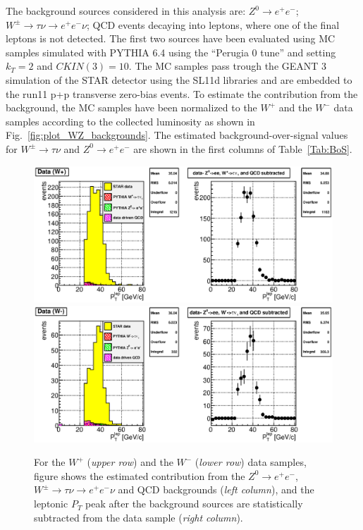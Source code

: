 \documentclass[12pt]{article}
\begin{document}
The background sources considered in this analysis are: 
$Z^{0} \rightarrow e^+e^-$; 
$W^{\pm} \rightarrow \tau\nu \rightarrow e^+e^-\nu$; 
QCD events decaying into leptons, where one of the final leptons is not detected.
The first two sources have been evaluated using MC samples simulated with PYTHIA 6.4 using the ``Perugia 0 tune'' and setting $k_{T}=2$ and $CKIN(3)=10$. The MC samples pass trough the GEANT 3 simulation of the STAR detector using the SL11d libraries and are embedded to the run11 p+p transverse zero-bias events. To estimate the contribution from the background, the MC samples have been normalized to the $W^{+}$ and the $W^{-}$ data samples according to the collected luminosity as shown in Fig.~\ref{fig:plot_WZ_backgrounds}. The estimated background-over-signal values for $W^{\pm} \rightarrow \tau\nu$ and $Z^{0} \rightarrow e^+e^-$ are shown in the first columns of Table~\ref{Tab:BoS}. 

\begin{figure}[htbp]
\begin{center}
\includegraphics[scale=0.8]{images/backgrounds/plot_5}
\includegraphics[scale=0.8]{images/backgrounds/plot_7}
\end{center}
\caption{For the $W^{+}$ ({\it upper row}) and the $W^{-}$ ({\it lower row}) data samples, figure shows the estimated contribution from the $Z^{0} \rightarrow e^+e^-$, $W^{\pm} \rightarrow \tau\nu \rightarrow e^+e^-\nu$ and QCD backgrounds ({\it left column}), and the leptonic $P_{T}$ peak after the background sources are statistically subtracted from the data sample ({\it right column}).}
\label{fig:plot_QCD_bkd_pt25} 
\end{figure}
\end{document}
